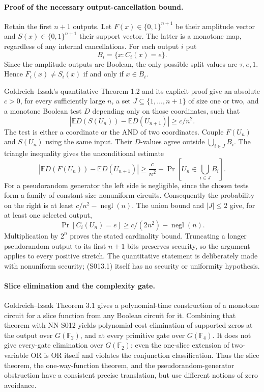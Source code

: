 \paragraph{Proof of the necessary output-cancellation bound.}
Retain the first $n+1$ outputs. Let $F(x)\in\{0,1\}^{n+1}$ be their
amplitude vector and $S(x)\in\{0,1\}^{n+1}$ their support vector.
The latter is a monotone map, regardless of any internal cancellations.
For each output $i$ put
\[
 B_i=\{x:C_i(x)=e\}.
\]
Since the amplitude outputs are Boolean, the only possible split
values are $\tau,e,1$. Hence $F_i(x)\ne S_i(x)$ if and only if
$x\in B_i$.

Goldreich--Izsak's quantitative Theorem 1.2 and its explicit proof
give an absolute $c>0$, for every sufficiently large $n$, a set
$J\subseteq\{1,\ldots,n+1\}$ of size one or two, and a monotone
Boolean test $D$ depending only on those coordinates, such that
\[
 |\mathbb E D(S(U_n))-\mathbb E D(U_{n+1})|\ge c/n^2.
\]
The test is either a coordinate or the AND of two coordinates.
Couple $F(U_n)$ and $S(U_n)$ using the same input. Their $D$-values
agree outside $\bigcup_{i\in J}B_i$. The triangle inequality gives
the unconditional estimate
\[
 |\mathbb E D(F(U_n))-\mathbb E D(U_{n+1})|
 \ge \frac{c}{n^2}
       -\Pr\left[U_n\in\bigcup_{i\in J}B_i\right].       \tag{S013.1}
\]
For a pseudorandom generator the left side is negligible, since the
chosen tests form a family of constant-size nonuniform circuits.
Consequently the probability on the right is at least
$c/n^2-\operatorname{negl}(n)$. The union bound and $|J|\le2$
give, for at least one selected output,
\[
 \Pr[C_i(U_n)=e]\ge c/(2n^2)-\operatorname{negl}(n).
\]
Multiplication by $2^n$ proves the stated cardinality bound.
Truncating a longer pseudorandom output to its first $n+1$ bits
preserves security, so the argument applies to every positive stretch.
The quantitative statement is deliberately made with nonuniform
security; (S013.1) itself has no security or uniformity hypothesis.

\paragraph{Slice elimination and the complexity gate.}
Goldreich--Izsak Theorem 3.1 gives a polynomial-time construction of
a monotone circuit for a slice function from any Boolean circuit for
it. Combining that theorem with NN-S012 yields polynomial-cost
elimination of supported zeros at the output over $G(\mathbb F_2)$,
and at every primitive gate over $G(\mathbb F_4)$. It does not give
every-gate elimination over $G(\mathbb F_2)$: even the one-slice
extension of two-variable OR is OR itself and violates the conjunction
classification. Thus the slice theorem, the one-way-function theorem,
and the pseudorandom-generator obstruction have a consistent precise
translation, but use different notions of zero avoidance.

